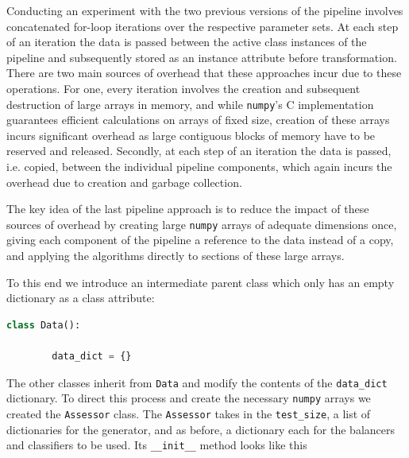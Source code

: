 Conducting an experiment with the two previous versions of the pipeline involves concatenated for-loop iterations over the respective parameter sets.
At each step of an iteration the data is passed between the active class instances of the pipeline and subsequently stored as an instance attribute before transformation.
There are two main sources of overhead that these approaches incur due to these operations.
For one, every iteration involves the creation and subsequent destruction of large arrays in memory, 
and while \texttt{numpy}'s C implementation guarantees efficient calculations on arrays of fixed size, 
creation of these arrays incurs significant overhead as large contiguous blocks of memory have to be reserved and released.
Secondly, at each step of an iteration the data is passed, i.e. copied, 
between the individual pipeline components, which again incurs the overhead due to creation and garbage collection.

The key idea of the last pipeline approach is to reduce the impact of these sources of overhead by creating large \texttt{numpy} arrays of adequate dimensions once,
giving each component of the pipeline a reference to the data instead of a copy, and applying the algorithms directly to sections of these large arrays.

To this end we introduce an intermediate parent class which only has an empty dictionary as a class attribute:
\begin{lstlisting}[language=Python, numbers=none]
class Data():

    	data_dict = {}
\end{lstlisting}

The other classes inherit from \texttt{Data} and modify the contents of the \texttt{data\_dict} dictionary.
To direct this process and create the necessary \texttt{numpy} arrays we created the \texttt{Assessor} class.
The \texttt{Assessor} takes in the \texttt{test\_size}, a list of dictionaries for the generator, and as before, a dictionary each for the balancers and classifiers to be used.
Its \texttt{\_\_init\_\_} method looks like this

